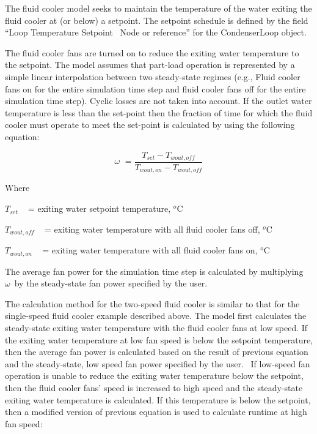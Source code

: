 The fluid cooler model seeks to maintain the temperature of the water exiting the fluid cooler at (or below) a setpoint. The setpoint schedule is defined by the field ``Loop Temperature Setpoint~ Node or reference'' for the CondenserLoop object.

The fluid cooler fans are turned on to reduce the exiting water temperature to the setpoint. The model assumes that part-load operation is represented by a simple linear interpolation between two steady-state regimes (e.g., Fluid cooler fans on for the entire simulation time step and fluid cooler fans off for the entire simulation time step). Cyclic losses are not taken into account. If the outlet water temperature is less than the set-point then the fraction of time for which the fluid cooler must operate to meet the set-point is calculated by using the following equation:

\begin{equation}
\omega \,\, = \frac{{{T_{set}} - {T_{wout,off}}}}{{{T_{wout,on}} - {T_{wout,off}}}}
\end{equation}

Where

\({T_{set}}\) ~ = exiting water setpoint temperature, \(^{o}\)C

\({T_{wout,off}}\) ~ = exiting water temperature with all fluid cooler fans off, \(^{o}\)C

\({T_{wout,on}}\) ~ = exiting water temperature with all fluid cooler fans on, \(^{o}\)C

The average fan power for the simulation time step is calculated by multiplying \(\omega \,\) by the steady-state fan power specified by the user.

The calculation method for the two-speed fluid cooler is similar to that for the single-speed fluid cooler example described above. The model first calculates the steady-state exiting water temperature with the fluid cooler fans at low speed. If the exiting water temperature at low fan speed is below the setpoint temperature, then the average fan power is calculated based on the result of previous equation and the steady-state, low speed fan power specified by the user.~ If low-speed fan operation is unable to reduce the exiting water temperature below the setpoint, then the fluid cooler fans' speed is increased to high speed and the steady-state exiting water temperature is calculated. If this temperature is below the setpoint, then a modified version of previous equation is used to calculate runtime at high fan speed:

